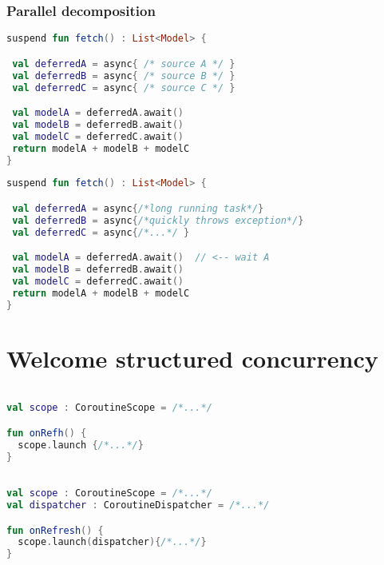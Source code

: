 \documentclass[10pt]{beamer}
\begin{document}
\begin{frame}[fragile]
\frametitle{Parallel decomposition}
\begin{lstlisting}[language=Kotlin, basicstyle=\ttfamily]
suspend fun fetch() : List<Model> {

 val deferredA = async{ /* source A */ }
 val deferredB = async{ /* source B */ }
 val deferredC = async{ /* source C */ }

 val modelA = deferredA.await() 
 val modelB = deferredB.await() 
 val modelC = deferredC.await() 
 return modelA + modelB + modelC
}
\end{lstlisting}
\end{frame}


\begin{frame}[fragile]
\begin{lstlisting}[language=Kotlin, basicstyle=\ttfamily]
suspend fun fetch() : List<Model> {

 val deferredA = async{/*long running task*/}
 val deferredB = async{/*quickly throws exception*/}
 val deferredC = async{/*...*/ }

 val modelA = deferredA.await()  // <-- wait A
 val modelB = deferredB.await() 
 val modelC = deferredC.await() 
 return modelA + modelB + modelC
}
\end{lstlisting}
\end{frame}

\section{Welcome structured concurrency}

\begin{frame}[fragile]
\begin{lstlisting}[language=Kotlin, basicstyle=\ttfamily]

val scope : CoroutineScope = /*...*/

fun onRefh() {
  scope.launch {/*...*/}
}
\end{lstlisting}
\end{frame}

\begin{frame}[fragile]
\begin{lstlisting}[language=Kotlin, basicstyle=\ttfamily]

val scope : CoroutineScope = /*...*/
val dispatcher : CoroutineDispatcher = /*...*/

fun onRefresh() {
  scope.launch(dispatcher){/*...*/}
}
\end{lstlisting}
\end{frame}
\end{document}
